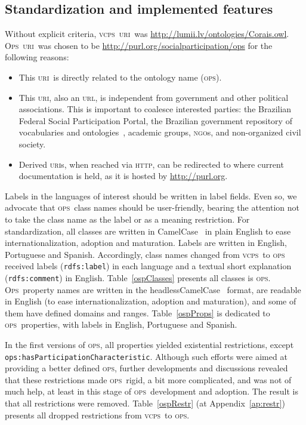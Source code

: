 \documentclass[10pt,letterpaper]{article}
\newcommand{\ops}{\textsc{ops}}
\newcommand{\opsi}{O\textsc{ps}}
\newcommand{\vcps}{\textsc{vcps}}
\newcommand{\uri}{\textsc{uri}}
\newcommand{\urll}{\textsc{url}}
\newcommand{\ngo}{\textsc{ngo}}
\newcommand{\http}{\textsc{http}}
\begin{document}
\subsection{Standardization and implemented features}\label{impl}
Without explicit criteria,
\vcps\ \uri\ was \url{http://lumii.lv/ontologies/Corais.owl}.
\opsi\ \uri\ was chosen to be \url{http://purl.org/socialparticipation/ops} for the following reasons:
\begin{itemize}
    \item This \uri\ is directly related to the ontology name (\ops).
    \item This \uri, also an \urll, is independent from government and other political associations.
    This is important to coalesce interested parties: the Brazilian Federal Social Participation Portal\cite{participa},
    the Brazilian government repository of vocabularies and ontologies~\cite{vocab},
    academic groups,  \ngo s, and non-organized civil society.
    \item Derived \uri s, when reached via \http, can be redirected to where current documentation is held,
    as it is hosted by \url{http://purl.org}.
\end{itemize}
Labels in the languages of interest should be written in label fields.
Even so, we advocate that \ops\ class names should be user-friendly,
bearing the attention not to take the class name as the label or as a meaning restriction.
For standardization, all classes are written in CamelCase~\cite{cc} in plain English to ease internationalization,
adoption and maturation.
Labels are written in English, Portuguese and Spanish.
Accordingly, class names changed from \vcps\ to \ops\,
received labels (\texttt{rdfs:label}) in each language
and a textual short explanation (\texttt{rdfs:comment}) in English. 
Table~\ref{ospClasses} presents all classes is \ops.
\opsi\ property names are written in the headlessCamelCase~\cite{cc} format,
are readable in English (to ease internationalization, adoption and maturation),
and some of them have defined domains and ranges.
Table~\ref{ospProps} is dedicated to \ops\ properties, with labels in English, Portuguese and Spanish.

In the first versions of \ops, all properties yielded existential restrictions,
except {\tt ops:hasParticipationCharacteristic}.
Although such efforts were aimed at providing a better defined \ops,
further developments and discussions revealed that these restrictions made \ops\ rigid,
a bit more complicated, and was not of much help,
at least in this stage of \ops\ development and adoption.
The result is that all restrictions were removed.
Table~\ref{ospRestr} (at Appendix~\ref{ap:restr}) presents all dropped restrictions from \vcps\ to \ops.
\end{document}
